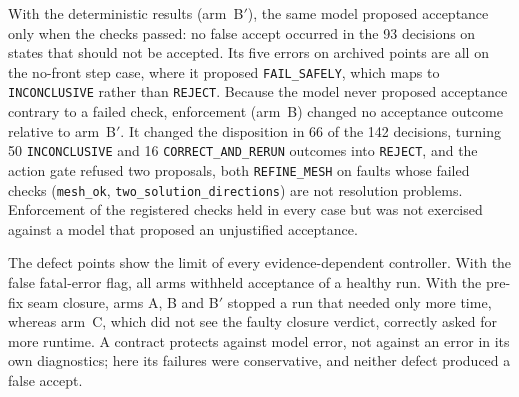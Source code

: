 \documentclass[11pt]{article}
\begin{document}
With the deterministic results (arm~B$'$), the same model proposed acceptance
only when the checks passed: no false accept occurred in the 93 decisions on
states that should not be accepted. Its five errors on archived points are all
on the no-front step case, where it proposed \texttt{FAIL\_SAFELY}, which maps
to \texttt{INCONCLUSIVE} rather than \texttt{REJECT}. Because the model never
proposed acceptance contrary to a failed check, enforcement (arm~B) changed no
acceptance outcome relative to arm~B$'$. It changed the disposition in 66 of
the 142 decisions, turning 50 \texttt{INCONCLUSIVE} and 16
\texttt{CORRECT\_AND\_RERUN} outcomes into \texttt{REJECT}, and the action gate
refused two proposals, both \texttt{REFINE\_MESH} on faults whose failed checks
(\texttt{mesh\_ok}, \texttt{two\_solution\_directions}) are not resolution
problems. Enforcement of the registered checks held in every case but was not
exercised against a model that proposed an unjustified acceptance.

The defect points show the limit of every evidence-dependent controller. With
the false fatal-error flag, all arms withheld acceptance of a healthy run. With
the pre-fix seam closure, arms A, B and B$'$ stopped a run that needed only
more time, whereas arm~C, which did not see the faulty closure verdict,
correctly asked for more runtime. A contract protects against model error, not
against an error in its own diagnostics; here its failures were conservative,
and neither defect produced a false accept.
\end{document}
